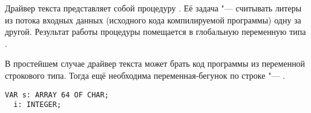 Драйвер текста представляет собой процедуру .
Её задача "--- считывать литеры из потока входных данных
(исходного кода компилируемой программы) одну за другой.
Результат работы процедуры  помещается в глобальную
переменную  типа .

В простейшем случае драйвер текста может брать код программы
из переменной строкового типа.
Тогда ещё необходима переменная-бегунок по строке "--- .

\begin{lstlisting}
VAR s: ARRAY 64 OF CHAR;
  i: INTEGER;
\end{lstlisting}
